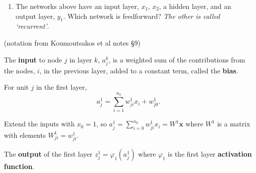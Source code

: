 \documentclass[12pt,letterpaper,noanswers]{exam}
\newcommand{\vc}[1]{\boldsymbol{#1}}
\begin{document}
\hfill

\begin{enumerate}[resume=classQ]
\item The networks above have an input layer, $x_1$, $x_2$, a hidden layer, and an output layer, $y_1$.  Which network is feedforward?  \emph{The other is called `recurrent'}.
\vspace{1cm}

\end{enumerate}
\begin{tcolorbox}
(notation from Koumoutsakos et al notes \S 9)

The \textbf{input} to node $j$ in layer $k$, $a_{j}^k$, is a weighted sum of the contributions from the nodes, $i$, in the previous layer, added to a constant term, called the \textbf{bias}. 

For unit $j$ in the first layer, \[a_j^1 = \sum\limits_{i=1}^{n_0} w_{ji}^1x_i + w_{j0}^1.\]

Extend the inputs with $x_0 = 1$, so $a_j^1 = \sum\limits_{i=0}^{n_0} w_{ji}^1x_i = W^1\vc{x}$ where $W^1$  is a matrix with elements $W^1_{ji} = w^1_{ji}$.

The \textbf{output} of the first layer $z_j^1 = \varphi_1(a_j^1)$ where $\varphi_1$ is the first layer \textbf{activation function}.
\end{tcolorbox}
\end{document}
